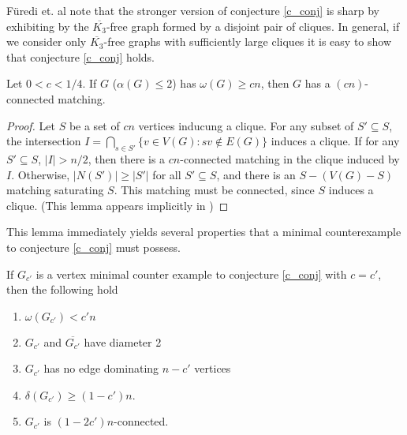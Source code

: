 F\"{u}redi et. al note that the stronger version of conjecture \ref{c_conj} is sharp by exhibiting by the $\overline{K_3}$-free graph formed by a disjoint pair of cliques.  In general, if we consider only $\overline{K_3}$-free graphs with sufficiently large cliques it is easy to show that conjecture \ref{c_conj} holds.
\begin{lem}Let $0<c<1/4$.  If $G$ ($\alpha(G) \leq 2$) has $\omega(G) \geq cn$, then $G$ has a $(cn)$-connected matching.
\label{spider}
\end{lem}
\begin{proof}
	Let $S$ be a set of $cn$ vertices inducung a clique.  For any subset of $S'\subseteq S$, the intersection $\displaystyle I = \bigcap_{s\in S'} \{v \in V(G): sv \notin E(G)\}$ induces a clique.  If for any $S'\subseteq S$, $|I| > n/2$, then there is a $cn$-connected matching in the clique induced by $I$.  Otherwise, $|N(S')| \geq |S'|$ for all $S'\subseteq S$, and there is an $S-(V(G)-S)$ matching saturating $S$.  This matching must be connected, since $S$ induces a clique. (This lemma appears implicitly in \cite{FGS})
\end{proof}
This lemma immediately yields several properties that a minimal counterexample to conjecture \ref{c_conj} must possess.
\begin{prop}
 If $G_{c'}$ is a vertex minimal counter example to conjecture \ref{c_conj} with $c = c'$, then the following hold 
\begin{enumerate}
	\item $\omega(G_{c'}) < c'n$
	\item $G_{c'}$ and $\overline{G_{c'}}$ have diameter 2
	\item $G_{c'}$ has no edge dominating $n-c'$ vertices
	\item $\delta(G_{c'}) \geq (1-c')n$.
	\item $G_{c'}$ is $(1-2c')n$-connected.
\end{enumerate}
\end{prop}
